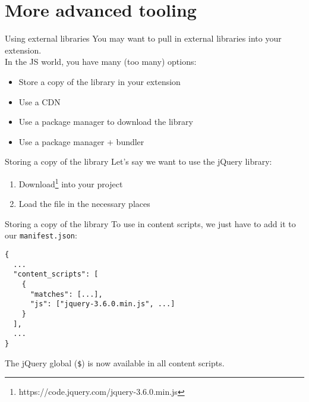\documentclass[../index.tex]{subfiles}
\begin{document}

\renewcommand{\sectiontitle}{More advanced tooling}
\section{\sectiontitle}

\renewcommand{\currenttitle}{Using external libraries}
\begin{frame}[fragile]{\currenttitle}
  You may want to pull in external libraries into your extension. \\[1em]

  In the JS world, you have many (too many) options:
  \begin{itemize}
    \item Store a copy of the library in your extension
    \item Use a CDN
    \item Use a package manager to download the library
    \item Use a package manager + bundler
  \end{itemize}
\end{frame}

\renewcommand{\currenttitle}{Storing a copy of the library}
\begin{frame}[fragile]{\currenttitle}
  Let's say we want to use the jQuery library:

  \begin{enumerate}
    \item Download\footnote{https://code.jquery.com/jquery-3.6.0.min.js} into
          your project
    \item Load the file in the necessary places
  \end{enumerate}
\end{frame}

\begin{frame}[fragile]{\currenttitle}
  To use in content scripts, we just have to add it to our
  \texttt{manifest.json}:

  \begin{lstlisting}[language=ES6]
{
  ...
  "content_scripts": [
    {
      "matches": [...],
      "js": ["jquery-3.6.0.min.js", ...]
    }
  ],
  ...
}
  \end{lstlisting}

  The jQuery global (\texttt{\$}) is now available in all content scripts.
\end{frame}
\end{document}

